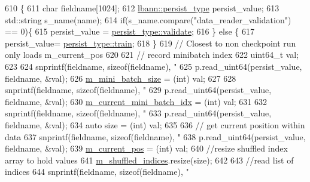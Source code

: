 \begin{DoxyCode}
610                                                                                   \{
611     \textcolor{keywordtype}{char} fieldname[1024];
612     \hyperlink{namespacelbann_adee41f31f15f3906cbdcce4a1417eb56}{lbann::persist\_type} persist\_value;
613     std::string s\_name(name);
614     \textcolor{keywordflow}{if}(s\_name.compare(\textcolor{stringliteral}{"data\_reader\_validation"}) == 0)\{
615       persist\_value = \hyperlink{namespacelbann_adee41f31f15f3906cbdcce4a1417eb56af9ab05454998236921a6b0e281fae632}{persist\_type::validate};
616     \} \textcolor{keywordflow}{else} \{
617        persist\_value= \hyperlink{namespacelbann_adee41f31f15f3906cbdcce4a1417eb56a61b3a8faa9c1091806675c230a9abe64}{persist\_type::train};
618     \}
619     \textcolor{comment}{// Closest to non checkpoint run only loads m\_current\_pos}
620 
621     \textcolor{comment}{// record minibatch index}
622     uint64\_t val;
623     
624     snprintf(fieldname, \textcolor{keyword}{sizeof}(fieldname), \textcolor{stringliteral}{"%
625     p.read\_uint64(persist\_value, fieldname, &val);
626     \hyperlink{classlbann_1_1generic__data__reader_a96f87a7d09711ab3eee3940ff2aa36ec}{m\_mini\_batch\_size} = (int) val;
627 
628     snprintf(fieldname, \textcolor{keyword}{sizeof}(fieldname), \textcolor{stringliteral}{"%
629     p.read\_uint64(persist\_value, fieldname, &val);
630     \hyperlink{classlbann_1_1generic__data__reader_aefd4bc0bf95de1e2500827581acf3536}{m\_current\_mini\_batch\_idx} = (int) val;
631 
632     snprintf(fieldname, \textcolor{keyword}{sizeof}(fieldname), \textcolor{stringliteral}{"%
633     p.read\_uint64(persist\_value, fieldname, &val);
634     \textcolor{keyword}{auto} size = (int) val;
635 
636     \textcolor{comment}{// get current position within data}
637     snprintf(fieldname, \textcolor{keyword}{sizeof}(fieldname), \textcolor{stringliteral}{"%
638     p.read\_uint64(persist\_value, fieldname, &val);
639     \hyperlink{classlbann_1_1generic__data__reader_a2facf4e410099ac8c1fa586e797ec2e0}{m\_current\_pos} = (int) val;
640     \textcolor{comment}{//resize shuffled index array to hold values}
641     \hyperlink{classlbann_1_1generic__data__reader_aaab6aeff67ffff1c689336851fec2c57}{m\_shuffled\_indices}.resize(size);
642 
643      \textcolor{comment}{//read list of indices}
644     snprintf(fieldname, \textcolor{keyword}{sizeof}(fieldname), \textcolor{stringliteral}{"%
}}}}}
\end{DoxyCode}
